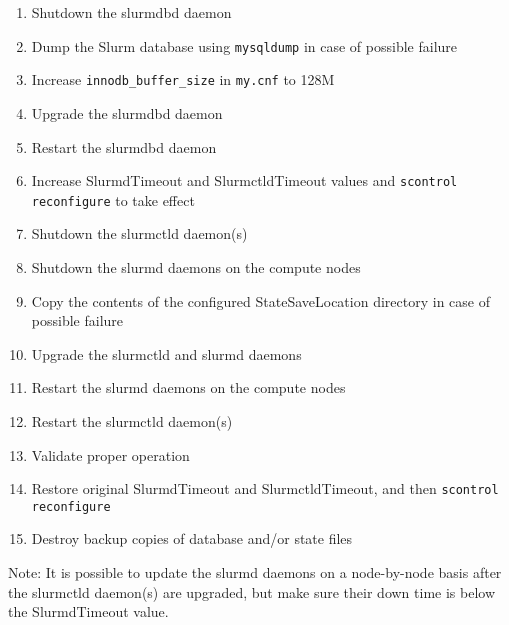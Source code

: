 \begin{enumerate}
  \item Shutdown the slurmdbd daemon
  \item Dump the Slurm database using \texttt{mysqldump} in case of possible failure
  \item Increase \texttt{innodb\_buffer\_size} in \texttt{my.cnf} to 128M
  \item Upgrade the slurmdbd daemon
  \item Restart the slurmdbd daemon
  \item Increase SlurmdTimeout and SlurmctldTimeout values and \texttt{scontrol reconfigure} to take effect
  \item Shutdown the slurmctld daemon(s)
  \item Shutdown the slurmd daemons on the compute nodes
  \item Copy the contents of the configured StateSaveLocation directory in case of possible failure
  \item Upgrade the slurmctld and slurmd daemons
  \item Restart the slurmd daemons on the compute nodes
  \item Restart the slurmctld daemon(s)
  \item Validate proper operation
  \item Restore original SlurmdTimeout and SlurmctldTimeout, and then \texttt{scontrol reconfigure}
  \item Destroy backup copies of database and/or state files
\end{enumerate}

Note: It is possible to update the slurmd daemons on a node-by-node basis after the slurmctld daemon(s) are upgraded, but make sure their down time is below the SlurmdTimeout value.

